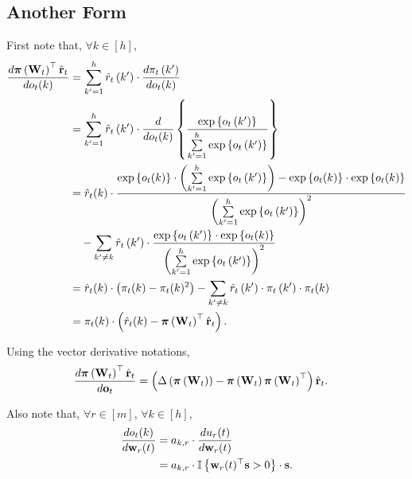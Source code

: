 \subsection{Another Form}

First note that, $\forall k \in [h]$,
\begin{equation*}
\begin{split}
    \frac{d {\boldsymbol{\pi}}\left( {\mathbf{W}}_t \right)^\top \hat{{\mathbf{r}}}_t}{d o_t(k)} &= \sum\limits_{k^\prime = 1}^{h}{ \hat{r}_{t}\left(k^\prime\right) \cdot \frac{d \pi_{t}\left(k^\prime\right) }{d o_t(k)}} \\
    &= \sum\limits_{k^\prime = 1}^{h}{ \hat{r}_{t}\left(k^\prime\right) \cdot \frac{d }{d o_t(k)}} \left\{ \frac{\exp\left\{ o_{t}\left(k^\prime\right) \right\}}{\sum\limits_{k^\prime = 1}^{h}{\exp\left\{ o_{t}\left(k^\prime\right) \right\}}} \right\} \\
    &= \hat{r}_{t}(k) \cdot \frac{ \exp\left\{ o_t(k) \right\} \cdot \left( \sum\limits_{k^\prime = 1}^{h}{\exp\left\{ o_{t}\left(k^\prime\right) \right\}} \right) - \exp\left\{ o_t(k) \right\} \cdot \exp\left\{ o_t(k) \right\} }{ \left( \sum\limits_{k^\prime = 1}^{h}{\exp\left\{ o_{t}\left(k^\prime\right) \right\}} \right)^2 } \\
    &\quad - \sum\limits_{k^\prime \not= k}{ \hat{r}_{t}\left(k^\prime\right) \cdot \frac{\exp\left\{ o_{t}\left(k^\prime\right) \right\} \cdot \exp\left\{ o_t(k) \right\} }{ \left( \sum\limits_{k^\prime = 1}^{h}{\exp\left\{ o_{t}\left(k^\prime\right) \right\}} \right)^2 }} \\
    &= \hat{r}_{t}(k) \cdot \left( \pi_t(k) - \pi_t(k)^2 \right) - \sum\limits_{k^\prime \not= k}{ \hat{r}_{t}\left(k^\prime\right) \cdot \pi_{t}\left(k^\prime\right) \cdot \pi_t(k) } \\
    &= \pi_t(k) \cdot \left( \hat{r}_{t}(k) - {\boldsymbol{\pi}}\left({\mathbf{W}}_t\right)^\top \hat{{\mathbf{r}}}_t \right).
\end{split}
\end{equation*}

\noindent Using the vector derivative notations,
\begin{equation*}
\begin{split}
    \frac{d {\boldsymbol{\pi}}\left( {\mathbf{W}}_t \right)^\top \hat{{\mathbf{r}}}_t}{d {\mathbf{o}}_t} &= \left( \Delta\left( {\boldsymbol{\pi}}\left({\mathbf{W}}_t\right) \right) - {\boldsymbol{\pi}}\left({\mathbf{W}}_t\right) {\boldsymbol{\pi}}\left({\mathbf{W}}_t\right)^\top \right) \hat{{\mathbf{r}}}_t.
\end{split}
\end{equation*}

\noindent Also note that, $\forall r \in [m]$, $\forall k \in [h]$,
\begin{equation*}
\begin{split}
    \frac{d o_t(k)}{d {\mathbf{w}}_r(t)} &= a_{k,r} \cdot \frac{d u_{r}(t)}{d {\mathbf{w}}_r(t)} \\
    &= a_{k,r} \cdot {\mathbb{I}}\left\{ {\mathbf{w}}_r(t)^\top {\mathbf{s}} > 0 \right\} \cdot {\mathbf{s}}.
\end{split}
\end{equation*}

